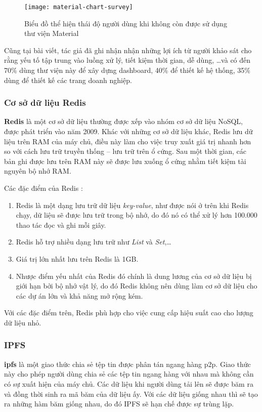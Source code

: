 \documentclass[../main-report.tex]{subfiles}
\begin{document}
\begin{figure}[ht!]
\begin{center}
\label{fig:material-chart-survey}
\texttt{[image: material-chart-survey]}
\caption{Biểu đồ thể hiện thái độ người dùng khi không còn được sử dụng thư viện Material}
\end{center}
\end{figure}

Cũng tại bài viết, tác giả đã ghi nhận nhận những lợi ích từ người khảo sát cho rằng yếu tố tập trung vào luồng xử lý, tiết kiệm thời gian, dễ dùng, \ldots và có đến 70\% dùng thư viện này để xây dựng dashboard, 40\% để thiết kế hệ thống, 35\% dùng để thiết kế các trang doanh nghiệp.

\subsubsection{Cơ sở dữ liệu Redis}
\textbf{Redis} là một cơ sở dữ liệu thường được xếp vào nhóm cơ sở dữ liệu NoSQL, được phát triển vào năm 2009. Khác với những cơ sở dữ liệu khác, Redis lưu dữ liệu trên RAM của máy chủ, điều này làm cho việc truy xuất giá trị nhanh hơn so với cách lưu trữ truyền thống – lưu trữ trên ổ cứng. Sau một thời gian, các bản ghi được lưu trên RAM này sẽ được lưu xuống ổ cứng nhằm tiết kiệm tài nguyên bộ nhớ RAM.

Các đặc điểm của Redis \cite{6106531}:

\begin{enumerate}[label=(\roman*)]
\item Redis là một dạng lưu trữ dữ liệu \textit{key-value}, như được nói ở trên khi Redis chạy, dữ liệu sẽ được lưu trữ trong bộ nhớ, do đó nó có thể xử lý hơn 100.000 thao tác đọc và ghi mỗi giây.
\item Redis hỗ trợ nhiều dạng lưu trữ như \textit{List} và \textit{Set},\ldots
\item Giá trị lớn nhất lưu trên Redis là 1GB.
\item Nhược điểm yếu nhất của Redis đó chính là dung lương của cơ sở dữ liệu bị giới hạn bởi bộ nhớ vật lý, do đó Redis không nên dùng làm cơ sở dữ liệu cho các dự án lớn và khả năng mở rộng kém.
\end{enumerate}

Với các đặc điểm trên, Redis phù hợp cho việc cung cấp hiệu suất cao cho lượng dữ liệu nhỏ.

\subsubsection{IPFS}
\textbf{\acrfull{ipfs}} là một giao thức chia sẻ tệp tin được phân tán ngang hàng \acrfull{p2p}. Giao thức này cho phép người dùng chia sẻ các tệp tin ngang hàng với nhau mà không cần có sự xuất hiện của máy chủ. Các dữ liệu khi người dùng tải lên sẽ được băm ra và đồng thời sinh ra mã băm của dữ liệu ấy. Với các dữ liệu giống nhau thì sẽ tạo ra những hàm băm giống nhau, do đó IPFS sẽ hạn chế được sự trùng lặp.
 
\end{document}
